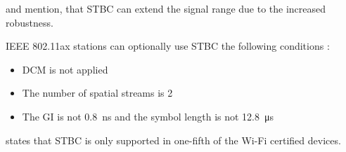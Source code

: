 \textcite{gast_80211n_nodate} and \textcite{sauter_wireless_2022} mention, that \ac{STBC} can extend the signal range
due to the increased robustness.


IEEE 802.11ax stations can optionally use \ac{STBC} the following conditions \cite{noauthor_ieee_2021}:
\begin{itemize}
	\item DCM is not applied
	\item The number of spatial streams is \num{2}
	\item The \ac{GI} is not \SI{0.8}{\nano\second} and the symbol length is not \SI{12.8}{\micro\second}
\end{itemize}

\cite{gast_80211n_nodate} states that \ac{STBC} is only supported in one-fifth of the Wi-Fi certified devices.

